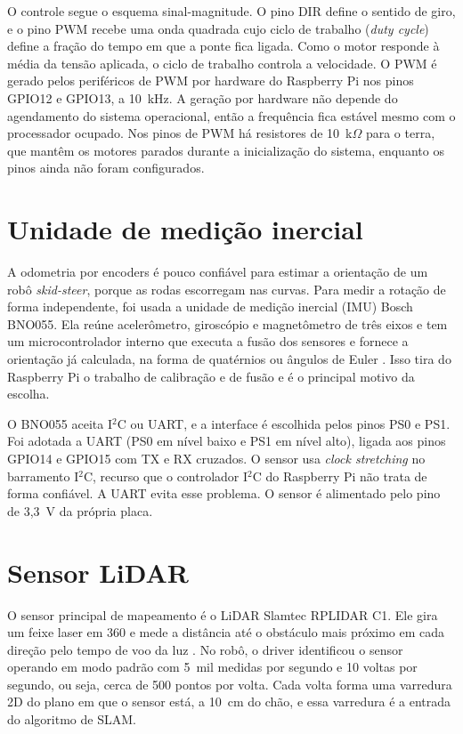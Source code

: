 O controle segue o esquema sinal-magnitude. O pino DIR define o sentido
de giro, e o pino PWM recebe uma onda quadrada cujo ciclo de trabalho
(\textit{duty cycle}) define a fração do tempo em que a ponte fica
ligada. Como o motor responde à média da tensão aplicada, o ciclo de
trabalho controla a velocidade. O PWM é gerado pelos periféricos de PWM
por hardware do Raspberry Pi nos pinos GPIO12 e GPIO13, a 10~kHz. A
geração por hardware não depende do agendamento do sistema operacional,
então a frequência fica estável mesmo com o processador ocupado. Nos
pinos de PWM há resistores de 10~k$\Omega$ para o terra, que mantêm os
motores parados durante a inicialização do sistema, enquanto os pinos
ainda não foram configurados.

\section{Unidade de medição inercial}

A odometria por encoders é pouco confiável para estimar a orientação de
um robô \textit{skid-steer}, porque as rodas escorregam nas curvas. Para
medir a rotação de forma independente, foi usada a unidade de medição
inercial (IMU) Bosch BNO055. Ela reúne acelerômetro, giroscópio e
magnetômetro de três eixos e tem um microcontrolador interno que executa
a fusão dos sensores e fornece a orientação já calculada, na forma de
quatérnios ou ângulos de Euler \cite{bno055}. Isso tira do Raspberry Pi o
trabalho de calibração e de fusão e é o principal motivo da escolha.

O BNO055 aceita I$^2$C ou UART, e a interface é escolhida pelos pinos PS0
e PS1. Foi adotada a UART (PS0 em nível baixo e PS1 em nível alto),
ligada aos pinos GPIO14 e GPIO15 com TX e RX cruzados. O sensor usa
\textit{clock stretching} no barramento I$^2$C, recurso que o controlador
I$^2$C do Raspberry Pi não trata de forma confiável. A UART evita esse
problema. O sensor é alimentado pelo pino de 3,3~V da própria placa.

\section{Sensor LiDAR}

O sensor principal de mapeamento é o LiDAR Slamtec RPLIDAR C1. Ele gira
um feixe laser em 360\textdegree{} e mede a distância até o obstáculo mais
próximo em cada direção pelo tempo de voo da luz \cite{rplidarc1}. No
robô, o driver identificou o sensor operando em modo padrão com 5~mil
medidas por segundo e 10 voltas por segundo, ou seja, cerca de 500 pontos
por volta. Cada volta forma uma varredura 2D do plano em que o sensor
está, a 10~cm do chão, e essa varredura é a entrada do algoritmo de SLAM.

